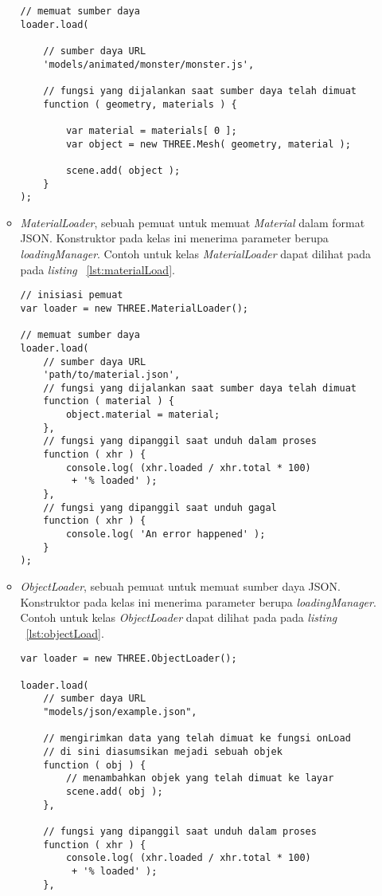 \begin{itemize}
\begin{itemize}
\begin{lstlisting}[caption={Contoh penggunaan kelas {\it JSONLoader}.}, label={lst:jsonLoad},captionpos=b]
// memuat sumber daya
loader.load(

	// sumber daya URL
	'models/animated/monster/monster.js',

	// fungsi yang dijalankan saat sumber daya telah dimuat
	function ( geometry, materials ) {

		var material = materials[ 0 ];
		var object = new THREE.Mesh( geometry, material );

		scene.add( object );
	}
);
\end{lstlisting}
		\item {\it MaterialLoader}, sebuah pemuat untuk memuat {\it Material} dalam format JSON. Konstruktor pada kelas ini menerima parameter berupa  {\it loadingManager}. Contoh untuk kelas {\it MaterialLoader} dapat dilihat pada pada {\it listing} ~\ref{lst:materialLoad}.
\begin{lstlisting}[caption={Contoh penggunaan kelas {\it MaterialLoader}.}, label={lst:materialLoad},captionpos=b]
// inisiasi pemuat
var loader = new THREE.MaterialLoader();

// memuat sumber daya
loader.load(
	// sumber daya URL
	'path/to/material.json',
	// fungsi yang dijalankan saat sumber daya telah dimuat
	function ( material ) {
		object.material = material;
	},
	// fungsi yang dipanggil saat unduh dalam proses
	function ( xhr ) {
		console.log( (xhr.loaded / xhr.total * 100)
		 + '% loaded' );
	},
	// fungsi yang dipanggil saat unduh gagal
	function ( xhr ) {
		console.log( 'An error happened' );
	}
);
\end{lstlisting}
		\item {\it ObjectLoader}, sebuah pemuat untuk memuat sumber daya JSON. Konstruktor pada kelas ini menerima parameter berupa  {\it loadingManager}. Contoh untuk kelas {\it ObjectLoader} dapat dilihat pada pada {\it listing} ~\ref{lst:objectLoad}.
\begin{lstlisting}[caption={Contoh penggunaan kelas {\it ObjectLoader}.}, label={lst:objectLoad},captionpos=b]
var loader = new THREE.ObjectLoader();

loader.load(
    // sumber daya URL
    "models/json/example.json",

    // mengirimkan data yang telah dimuat ke fungsi onLoad
    // di sini diasumsikan mejadi sebuah objek
    function ( obj ) {
		// menambahkan objek yang telah dimuat ke layar
        scene.add( obj );
    },

    // fungsi yang dipanggil saat unduh dalam proses
    function ( xhr ) {
        console.log( (xhr.loaded / xhr.total * 100)
         + '% loaded' );
    },


\end{lstlisting}
\end{itemize}
\end{itemize}
